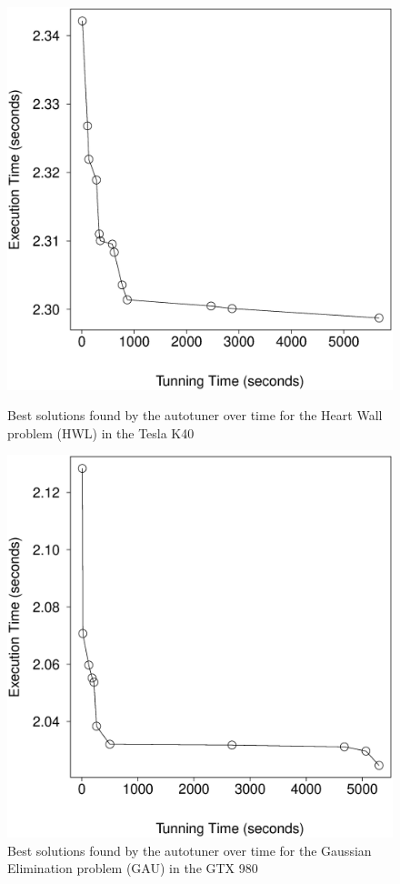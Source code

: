 \begin{figure}[htpb]
    \centering
    \begin{minipage}{.48\textwidth}
        \centering
        \includegraphics[scale=.22]{./images/heartwall-0-Tesla-K40-Best.eps}
        \caption{Best solutions found by the autotuner over time for the Heart Wall problem (HWL) in the Tesla K40}
        \label{fig:K40hwBest}
    \end{minipage}%
    \hfill
    \begin{minipage}{.48\textwidth}
        \centering
        \includegraphics[scale=.22]{./images/gaussian-0-GTX-980-Best.eps}
        \caption{Best solutions found by the autotuner over time for the Gaussian Elimination problem (GAU) in the GTX 980}
        \label{fig:980gauBest}
    \end{minipage}%
\end{figure}

